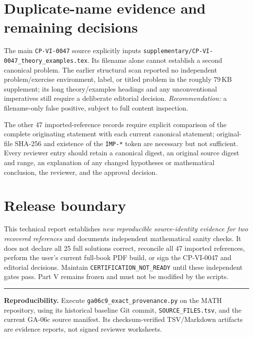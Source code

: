 \documentclass[11pt,a4paper]{article}
\newcommand{\CP}[1]{\texttt{CP-VI-#1}}
\begin{document}
\section{Duplicate-name evidence and remaining decisions}
The main \CP{0047} source explicitly inputs \texttt{supplementary/CP-VI-0047\_theory\_examples.tex}. Its filename alone cannot establish a second canonical problem. The earlier structural scan reported no independent problem/exercise environment, label, or titled problem in the roughly 79\,KB supplement; its long theory/examples headings and any unconventional imperatives still require a deliberate editorial decision. \emph{Recommendation:} a filename-only false positive, subject to full content inspection.

The other 47 imported-reference records require explicit comparison of the complete originating statement with each current canonical statement; original-file SHA-256 and existence of the \texttt{IMP-*} token are necessary but not sufficient. Every reviewer entry should retain a canonical digest, an original source digest and range, an explanation of any changed hypotheses or mathematical conclusion, the reviewer, and the approval decision.

\section{Release boundary}
This technical report establishes \emph{new reproducible source-identity evidence for two recovered references} and documents independent mathematical sanity checks. It does not declare all 25 full solutions correct, reconcile all 47 imported references, perform the user's current full-book PDF build, or sign the CP-VI-0047 and editorial decisions. Maintain \texttt{CERTIFICATION\_NOT\_READY} until these independent gates pass. Part V remains frozen and must not be modified by the scripts.

\vspace{7pt}\hrule\vspace{6pt}
{\footnotesize\textbf{Reproducibility.} Execute \texttt{ga06c9\_exact\_provenance.py} on the MATH repository, using its historical baseline Git commit, \texttt{SOURCE\_FILES.tsv}, and the current GA-06c source manifest. Its checksum-verified TSV/Markdown artifacts are evidence reports, not signed reviewer worksheets.}
\end{document}
